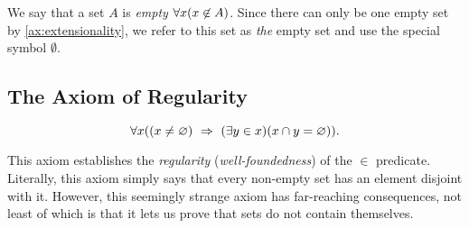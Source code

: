 \begin{definition}
    We say that a set \(A\) is \emph{empty} \iffbydefn \(\forall x \pn*{x \not \in A}\).
    Since there can only be one empty set by \autoref{ax:extensionality},
    we refer to this set as \emph{the} empty set and use the special symbol \(\emptyset\).
\end{definition}

\subsection{The Axiom of Regularity}
\begin{axiom}[Regularity]\label{ax:regularity}
    \[
        \forall x \pn*{\pn*{x \neq \emptyset} \implies \pn*{\exists y \in x}\pn*{x \intersect y = \emptyset}}.
    \]

    This axiom establishes the \emph{regularity} (\aka \emph{well-foundedness}) of the \(\in\) predicate.
    Literally, this axiom simply says that every non-empty set has an element disjoint with it.
    However, this seemingly strange axiom has far-reaching consequences,
    not least of which is that it lets us prove that sets do not contain themselves.
\end{axiom}

